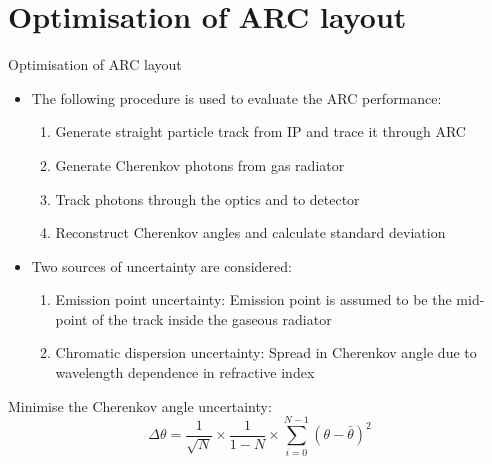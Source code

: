 \documentclass{beamer}
\begin{document}
\section{Optimisation of ARC layout}
\begin{frame}{Optimisation of ARC layout}
  \begin{itemize}
    \setlength\itemsep{0.7em}
    \item{The following procedure is used to evaluate the ARC performance:}
    \begin{enumerate}
      \setlength\itemsep{0.2em}
      \item{Generate straight particle track from IP and trace it through ARC}
      \item{Generate Cherenkov photons from gas radiator}
      \item{Track photons through the optics and to detector}
      \item{Reconstruct Cherenkov angles and calculate standard deviation}
    \end{enumerate}

    \item{Two sources of uncertainty are considered:}
    \begin{enumerate}
      \setlength\itemsep{0.2em}
      \item{Emission point uncertainty: Emission point is assumed to be the mid-point of the track inside the gaseous radiator}
      \item{Chromatic dispersion uncertainty: Spread in Cherenkov angle due to wavelength dependence in refractive index}
    \end{enumerate}
  \end{itemize}
  \begin{block}{Minimise the Cherenkov angle uncertainty:}
    \begin{equation*}
      \Delta\theta = \frac{1}{\sqrt{N}}\times\frac{1}{1 - N}\times\sum_{i = 0}^{N - 1}(\theta - \bar{\theta})^2
    \end{equation*}
  \end{block}
\end{frame}
\end{document}
